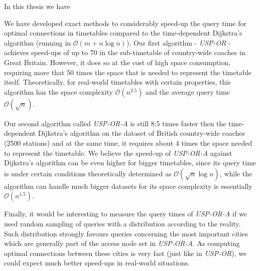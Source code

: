 In this thesis we have 

We have developed exact methods to considerably speed-up the query time for optimal connections in timetables compared to the time-dependent Dijkstra's algorithm (running in $\mathcal{O}(m + n \log n)$). Our first algorithm - \textit{USP-OR} - achieves speed-ups of up to 70 in the sub-timetable of country-wide coaches in Great Britain. However, it does so at the cost of high space consumption, requiring more that 50 times the space that is needed to represent the timetable itself. Theoretically, for real-world timetables with certain properties, this algorithm has the space complexity $\mathcal{O}(n^{2.5})$ and the average query time $\mathcal{O}(\sqrt{n})$.
	
Our second algorithm called \textit{USP-OR-A} is still 8.5 times faster then the time-dependent Dijkstra's algorithm on the dataset of British country-wide coaches (2500 stations) and at the same time, it requires about 4 times the space needed to represent the timetable. We believe the speed-up of \textit{USP-OR-A} against Dijkstra's algorithm can be even higher for bigger timetables, since its query time is under certain conditions theoretically determined as $\mathcal{O}(\sqrt{n} \log n)$, while the algorithm can handle much bigger datasets for its space complexity is essentially $\mathcal{O}(n^{1.5})$. 
	
Finally, it would be interesting to measure the query times of \textit{USP-OR-A} if we used random sampling of queries with a distribution according to the reality. Such distribution strongly favours queries concerning the most important cities which are generally part of the access node set in \textit{USP-OR-A}. As computing optimal connections between these cities is very fast (just like in \textit{USP-OR}), we could expect much better speed-ups in real-world situations.